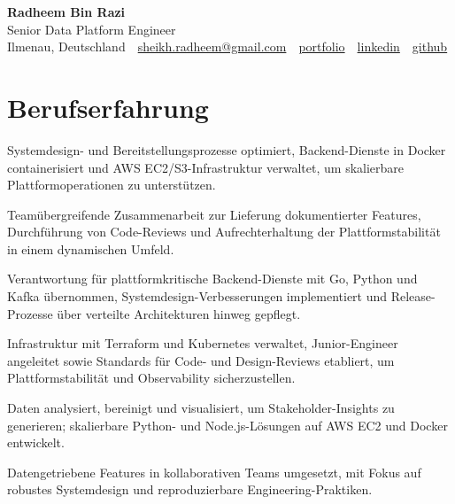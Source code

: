 \documentclass[11pt,a4paper]{resume}
\makeatletter
\newcommand{\Portfolio}{https://radheem.github.io/my-cv}
\newcommand{\PortfolioText}{portfolio}
\newcommand{\GitHub}{https://github.com/radheem}
\newcommand{\LinkedIn}{https://www.linkedin.com/in/radheem-razi}
\newcommand{\Email}{sheikh.radheem@gmail.com}
\makeatother
\begin{document}
\clearpage
{}

\begin{center}
  {\huge\bfseries Radheem Bin Razi}\\[3pt]
  {\large Senior Data Platform Engineer}\\[6pt]
  \small
  Ilmenau, Deutschland \,\textbar\,
  \href{mailto:\Email}{\Email} \,\textbar\,
  \href{\Portfolio}{\PortfolioText} \,\textbar\,
  \href{\LinkedIn}{linkedin} \,\textbar\,
  \href{\GitHub}{github}
\end{center}
\vspace{2pt}

\section{Berufserfahrung}

\bullets
  \item Systemdesign- und Bereitstellungsprozesse optimiert, Backend-Dienste in Docker containerisiert und AWS EC2/S3-Infrastruktur verwaltet, um skalierbare Plattformoperationen zu unterstützen.
  \item Teamübergreifende Zusammenarbeit zur Lieferung dokumentierter Features, Durchführung von Code-Reviews und Aufrechterhaltung der Plattformstabilität in einem dynamischen Umfeld.
\bulletsend
\vspace{3pt}
\bullets
  \item Verantwortung für plattformkritische Backend-Dienste mit Go, Python und Kafka übernommen, Systemdesign-Verbesserungen implementiert und Release-Prozesse über verteilte Architekturen hinweg gepflegt.
  \item Infrastruktur mit Terraform und Kubernetes verwaltet, Junior-Engineer angeleitet sowie Standards für Code- und Design-Reviews etabliert, um Plattformstabilität und Observability sicherzustellen.
\bulletsend
\vspace{3pt}
\bullets
  \item Daten analysiert, bereinigt und visualisiert, um Stakeholder-Insights zu generieren; skalierbare Python- und Node.js-Lösungen auf AWS EC2 und Docker entwickelt.
  \item Datengetriebene Features in kollaborativen Teams umgesetzt, mit Fokus auf robustes Systemdesign und reproduzierbare Engineering-Praktiken.
\bulletsend
\vspace{3pt}
\end{document}

